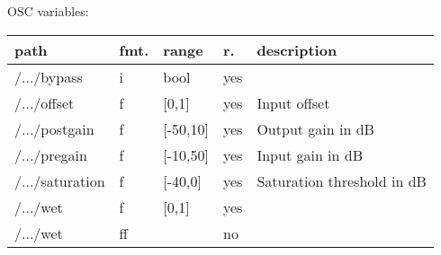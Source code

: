 \begin{snugshade}
{\footnotesize
\label{osctab:tascaraptubesim}
OSC variables:
\nopagebreak

\begin{tabularx}{\textwidth}{llllX}
\hline
path & fmt. & range & r. & description\\
\hline
/.../bypass & i & bool & yes & \\
/.../offset & f & [0,1] & yes & Input offset\\
/.../postgain & f & [-50,10] & yes & Output gain in dB\\
/.../pregain & f & [-10,50] & yes & Input gain in dB\\
/.../saturation & f & [-40,0] & yes & Saturation threshold in dB\\
/.../wet & f & [0,1] & yes & \\
/.../wet & ff &  & no & \\
\hline
\end{tabularx}
}
\end{snugshade}
